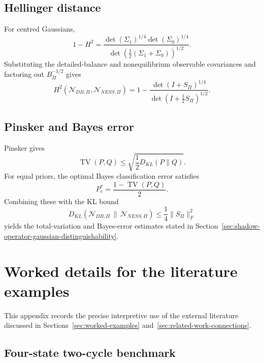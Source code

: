 \documentclass[11pt,a4paper]{article}
\numberwithin{equation}{section}
\theoremstyle{thmcompact}
\theoremstyle{remark}
\begin{document}
\subsection{Hellinger distance}

For centred Gaussians,
\begin{equation}
1-H^2
=
\frac{\det(\Sigma_1)^{1/4}\det(\Sigma_0)^{1/4}}
{\det\left(\frac12(\Sigma_1+\Sigma_0)\right)^{1/2}}.
\end{equation}
Substituting the detailed-balance and nonequilibrium observable covariances and factoring out \(B_\Pi^{-1/2}\) gives
\begin{equation}
H^2\!\left(\mathcal N_{DB,\Pi},\mathcal N_{NESS,\Pi}\right)
=
1-
\frac{\det(I+S_\Pi)^{1/4}}{\det(I+\tfrac12 S_\Pi)^{1/2}}.
\end{equation}

\subsection{Pinsker and Bayes error}

Pinsker gives
\begin{equation}
\operatorname{TV}(P,Q)\le \sqrt{\frac12 D_{KL}(P\|Q)}.
\end{equation}
For equal priors, the optimal Bayes classification error satisfies
\begin{equation}
P_e^\ast=\frac{1-\operatorname{TV}(P,Q)}{2}.
\end{equation}
Combining these with the KL bound
\begin{equation}
D_{KL}\!\left(\mathcal N_{DB,\Pi}\,\|\,\mathcal N_{NESS,\Pi}\right)\le \frac14\|S_\Pi\|_F^2
\end{equation}
yields the total-variation and Bayes-error estimates stated in Section~\ref{sec:shadow-operator-gaussian-distinguishability}.

\section{Worked details for the literature examples}
\label{app:worked_details_literature_examples}

This appendix records the precise interpretive use of the external literature discussed in Sections~\ref{sec:worked-examples} and~\ref{sec:related-work-connections}.

\subsection{Four-state two-cycle benchmark}
\end{document}
